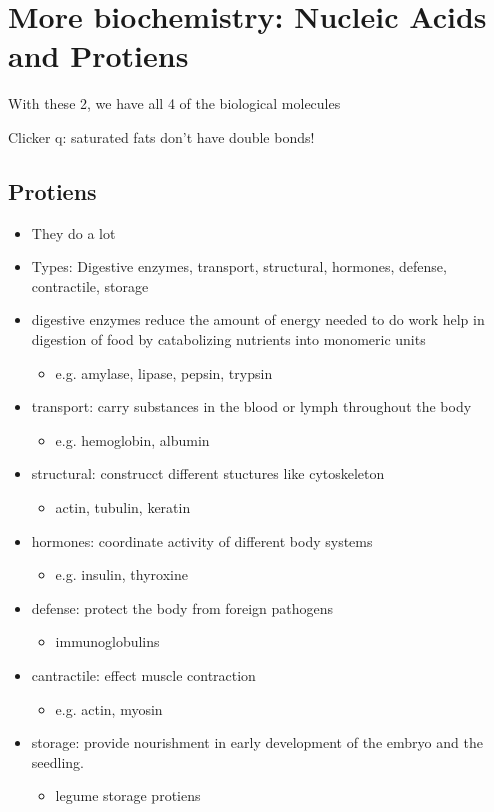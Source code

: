 \documentclass{article}
\theoremstyle{definition}
\begin{document}
\section{More biochemistry: Nucleic Acids and Protiens}
With these 2, we have all 4 of the biological molecules

Clicker q: saturated fats don't have double bonds!

\subsection{Protiens}
\begin{itemize}
	\item They do a lot
	\item Types: Digestive enzymes, transport, structural, hormones, defense, contractile, storage
	\item digestive enzymes reduce the amount of energy needed to do work help in digestion of food by catabolizing nutrients into monomeric units
		\begin{itemize}
			\item e.g. amylase, lipase, pepsin, trypsin
		\end{itemize}
	\item transport: carry substances in the blood or lymph throughout the body
		\begin{itemize}
			\item e.g. hemoglobin, albumin
		\end{itemize}
	\item structural: construcct different stuctures like cytoskeleton
		\begin{itemize}
			\item actin, tubulin, keratin
		\end{itemize}
	\item hormones: coordinate activity of different body systems
		\begin{itemize}
			\item e.g. insulin, thyroxine
		\end{itemize}
	\item defense: protect the body from foreign pathogens
		\begin{itemize}
			\item immunoglobulins
		\end{itemize}
	\item cantractile: effect muscle contraction
		\begin{itemize}
			\item e.g. actin, myosin
		\end{itemize}
	\item storage: provide nourishment in early development of the embryo and the seedling.
		\begin{itemize}
			\item legume storage protiens
		\end{itemize}
	

\end{itemize}
\end{document}
